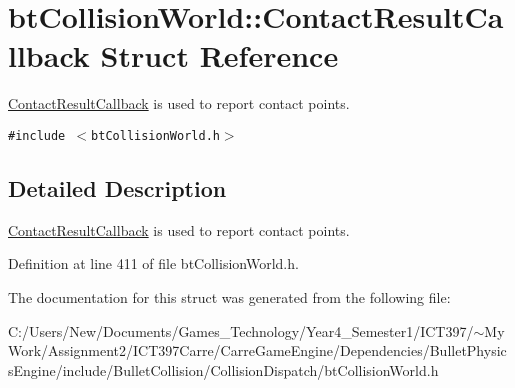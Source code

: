 \hypertarget{structbt_collision_world_1_1_contact_result_callback}{
\section{btCollisionWorld::ContactResultCallback Struct Reference}
\label{structbt_collision_world_1_1_contact_result_callback}
}
\hyperlink{structbt_collision_world_1_1_contact_result_callback}{ContactResultCallback} is used to report contact points.  


{\tt \#include $<$btCollisionWorld.h$>$}



\subsection{Detailed Description}
\hyperlink{structbt_collision_world_1_1_contact_result_callback}{ContactResultCallback} is used to report contact points. 

Definition at line 411 of file btCollisionWorld.h.

The documentation for this struct was generated from the following file:\begin{CompactItemize}
\item 
C:/Users/New/Documents/Games\_\-Technology/Year4\_\-Semester1/ICT397/$\sim$My Work/Assignment2/ICT397Carre/CarreGameEngine/Dependencies/BulletPhysicsEngine/include/BulletCollision/CollisionDispatch/btCollisionWorld.h\end{CompactItemize}
